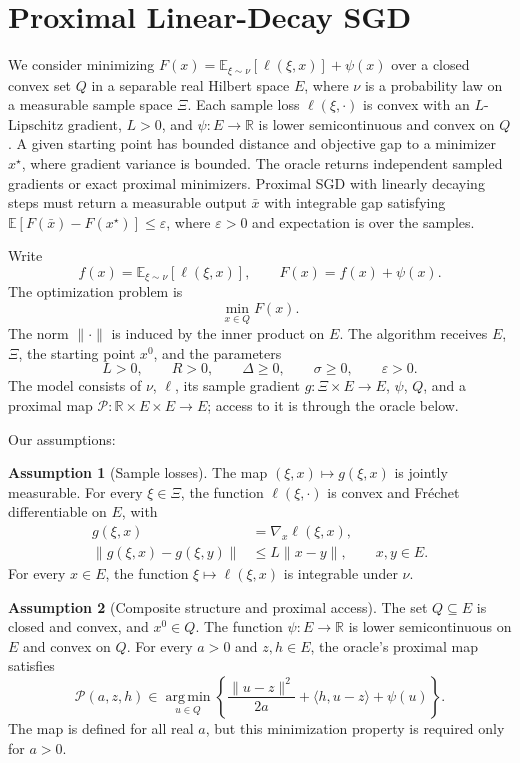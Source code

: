 \documentclass[10pt]{article}
\theoremstyle{definition}
\newtheorem{assumption}{Assumption}
\begin{document}
\section*{Proximal Linear-Decay SGD}
We consider minimizing $F(x)=\mathbb{E}_{\xi\sim\nu}[\ell(\xi,x)]+\psi(x)$ over a closed convex set $Q$ in a separable real Hilbert space $E$, where $\nu$ is a probability law on a measurable sample space $\Xi$. Each sample loss $\ell(\xi,\cdot)$ is convex with an $L$-Lipschitz gradient, $L>0$, and $\psi:E\to\mathbb{R}$ is lower semicontinuous and convex on $Q$. A given starting point has bounded distance and objective gap to a minimizer $x^\star$, where gradient variance is bounded. The oracle returns independent sampled gradients or exact proximal minimizers. Proximal SGD with linearly decaying steps must return a measurable output $\bar{x}$ with integrable gap satisfying $\mathbb{E}[F(\bar{x})-F(x^\star)]\leq\varepsilon$, where $\varepsilon>0$ and expectation is over the samples.

Write
\[
f(x)=\mathbb{E}_{\xi\sim\nu}[\ell(\xi,x)],
\qquad F(x)=f(x)+\psi(x).
\]
The optimization problem is
\[
\min_{x\in Q} F(x).
\]
The norm $\|\cdot\|$ is induced by the inner product on $E$. The algorithm receives $E$, $\Xi$, the starting point $x^0$, and the parameters
\[
L>0,\qquad R>0,\qquad \Delta\geq0,
\qquad \sigma\geq0,\qquad \varepsilon>0.
\]
The model consists of $\nu$, $\ell$, its sample gradient $g:\Xi\times E\to E$, $\psi$, $Q$, and a proximal map $\mathcal{P}:\mathbb{R}\times E\times E\to E$; access to it is through the oracle below.

Our assumptions:
\begin{assumption}[Sample losses]
The map $(\xi,x)\mapsto g(\xi,x)$ is jointly measurable. For every $\xi\in\Xi$, the function $\ell(\xi,\cdot)$ is convex and Fr\'echet differentiable on $E$, with
\[
\begin{aligned}
g(\xi,x)&=\nabla_x\ell(\xi,x),\\
\|g(\xi,x)-g(\xi,y)\|&\leq L\|x-y\|,
\qquad x,y\in E.
\end{aligned}
\]
For every $x\in E$, the function $\xi\mapsto\ell(\xi,x)$ is integrable under $\nu$.
\end{assumption}

\begin{assumption}[Composite structure and proximal access]
The set $Q\subseteq E$ is closed and convex, and $x^0\in Q$. The function $\psi:E\to\mathbb{R}$ is lower semicontinuous on $E$ and convex on $Q$. For every $a>0$ and $z,h\in E$, the oracle's proximal map satisfies
\[
\mathcal{P}(a,z,h)\in
\operatorname*{arg\,min}_{u\in Q}
\left\{\frac{\|u-z\|^2}{2a}
+\langle h,u-z\rangle+\psi(u)\right\}.
\]
The map is defined for all real $a$, but this minimization property is required only for $a>0$.
\end{assumption}
\end{document}
